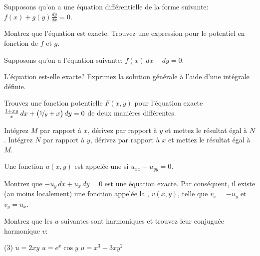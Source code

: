 \begin{exercise}
	Supposons qu'on a une équation différentielle de la forme suivante:
	$f(x) + g(y) \frac{dy}{dx} = 0$.
	\begin{tasks}
		\task Montrez que l'équation est exacte.
		\task Trouvez une expression pour le potentiel en fonction de $f$ et $g$.
	\end{tasks}
\end{exercise}

\begin{exercise}
	Supposons qu'on a l'équation suivante: $f(x) \, dx - dy = 0$.
	\begin{tasks}
		\task L'équation est-elle exacte?
		\task Exprimez la solution générale à l'aide d'une intégrale définie.
	\end{tasks}
\end{exercise}

\begin{exercise}
	Trouvez une fonction potentielle $F(x,y)$ pour l'équation exacte
	$\frac{1+xy}{x}\, dx + \bigl(\nicefrac{1}{y} + x \bigr) \, dy = 0$ de deux manières différentes.
	\begin{tasks}
		\task Intégrez $M$ par rapport à $x$, dérivez par rapport à $y$ et mettez le résultat égal à $N$.
		\task Intégrez $N$ par rapport à $y$, dérivez par rapport à $x$ et mettez le résultat égal à  $M$.
	\end{tasks}
\end{exercise}

\begin{samepage}
\begin{exercise}
	Une fonction $u(x,y)$ est appelée une \emph{} si
	$u_{xx} + u_{yy} = 0$.
	\begin{tasks}
	\task Montrez que $-u_y \, dx + u_x \, dy = 0$ est une équation exacte.
			Par conséquent, il  existe (au moins localement) une fonction appelée la \emph{\myindex{conjuguée harmonique}},
			$v(x,y)$, telle que $v_x = -u_y$ et $v_y = u_x$.
	\end{tasks}
	Montrez que les $u$ suivantes sont harmoniques et trouvez leur conjuguée harmonique $v$:
	\begin{tasks}[resume](3)
		\task $u = 2xy$
		\task $u = e^x \cos y$
		\task $u = x^3-3xy^2$
	\end{tasks}
	\end{exercise}
\end{samepage}

\setcounter{exercise}{100}

